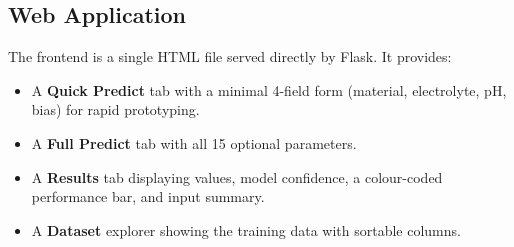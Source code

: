\subsection{Web Application}

The frontend is a single HTML file served directly by Flask.
It provides:
\begin{itemize}
  \item A \textbf{Quick Predict} tab with a minimal 4-field form (material,
        electrolyte, pH, bias) for rapid prototyping.
  \item A \textbf{Full Predict} tab with all 15 optional parameters.
  \item A \textbf{Results} tab displaying values, model confidence, a
        colour-coded performance bar, and input summary.
  \item A \textbf{Dataset} explorer showing the training data with
        sortable columns.
\end{itemize}
